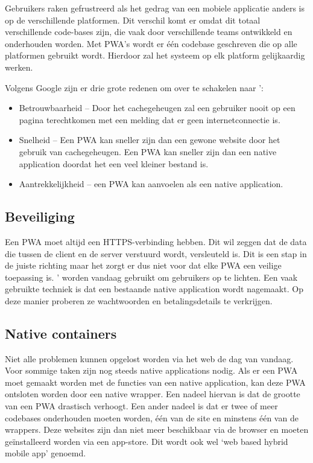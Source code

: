 Gebruikers raken gefrustreerd als het gedrag van een mobiele applicatie anders is op de verschillende platformen. Dit verschil komt er omdat dit totaal verschillende code-bases zijn, die vaak door verschillende teams ontwikkeld en onderhouden worden. Met PWA's wordt er één codebase geschreven die op alle platformen gebruikt wordt. Hierdoor zal het systeem op elk platform gelijkaardig werken.
\autocite{Google2019}

Volgens Google zijn er drie grote redenen om over te schakelen naar ':
\begin{itemize}
    \item Betrouwbaarheid – Door het cachegeheugen zal een gebruiker nooit op een pagina terechtkomen met een melding dat er geen internetconnectie is.
    \item Snelheid – Een PWA kan sneller zijn dan een gewone website door het gebruik van cachegeheugen. Een PWA kan sneller zijn dan een native application doordat het een veel kleiner bestand is.
    \item Aantrekkelijkheid – een PWA kan aanvoelen als een native application.
\end{itemize}
\autocite{GooglePwa2019}

\subsection{Beveiliging}
Een PWA moet altijd een HTTPS-verbinding hebben. Dit wil zeggen dat de data die tussen de client en de server verstuurd wordt, versleuteld is.
\autocite{Durumeric2013}
Dit is een stap in de juiste richting maar het zorgt er dus niet voor dat elke PWA een veilige toepassing is. ' worden vandaag gebruikt om gebruikers op te lichten. Een vaak gebruikte techniek is dat een bestaande native application wordt nagemaakt. Op deze manier proberen ze wachtwoorden en betalingsdetails te verkrijgen.
\autocite{Lee2018}

\subsection{Native containers}
Niet alle problemen kunnen opgelost worden via het web de dag van vandaag. Voor sommige taken zijn nog steeds native applications nodig. Als er een PWA moet gemaakt worden met de functies van een native application, kan deze PWA ontsloten worden door een native wrapper.
Een nadeel hiervan is dat de grootte van een PWA drastisch verhoogt.
Een ander nadeel is dat er twee of meer codebases onderhouden moeten worden, één van de site en minstens één van de wrappers.
Deze websites zijn dan niet meer beschikbaar via de browser en moeten geïnstalleerd worden via een app-store.
Dit wordt ook wel ‘web based hybrid mobile app’ genoemd.
\autocite{Richard2019} \autocite{Malavolta2016}

